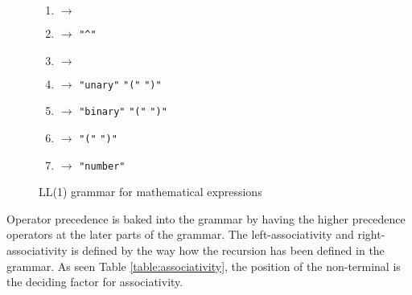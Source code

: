 \begin{figure}[ht]
\begin{multicols}{2}
\begin{enumerate}
      \item {} $\rightarrow$   
      \item {} $\rightarrow$ \texttt{"^"}  
      \item {} $\rightarrow$ 

      \item {} $\rightarrow$ \texttt{"unary"} \texttt{"("}  \texttt{")"} 
      \item {} $\rightarrow$ \texttt{"binary"} \texttt{"("}  \code{,}  \texttt{")"} 
      \item {} $\rightarrow$ \texttt{"("}  \texttt{")"} 
      \item {} $\rightarrow$ \texttt{"number"} 
    \end{enumerate}
  \end{multicols}
  \caption{LL(1) grammar for mathematical expressions}
  \label{fig:math-grammar}
\end{figure}


Operator precedence is baked into the grammar by having the higher precedence operators at the later parts of the grammar. The left-associativity and right-associativity is defined by the way how the recursion has been defined in the grammar. As seen Table \ref{table:associativity}, the position of the non-terminal is the deciding factor for associativity.


